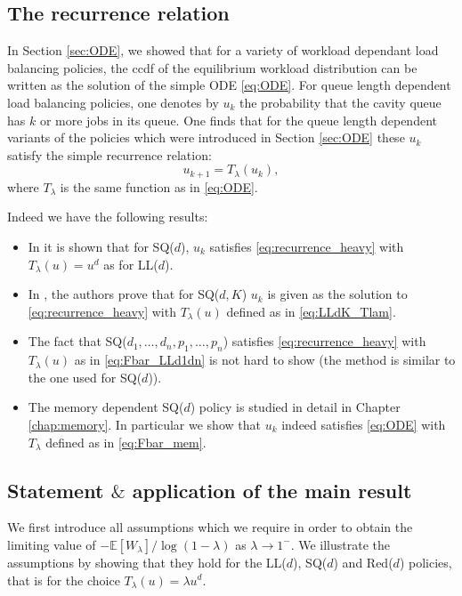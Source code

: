 \documentclass[12pt]{report}
\newcommand{\E}{\mathbb{E}}
\begin{document}
\subsection{The recurrence relation} \label{sec:recurrence}
In Section \ref{sec:ODE}, we showed that for a variety of workload dependant load balancing policies, the ccdf of the equilibrium workload distribution can be written as the solution of the simple ODE \eqref{eq:ODE}. For queue length dependent load balancing policies, one denotes by $u_k$ the probability that the cavity queue has $k$ or more jobs in its queue. One finds that for the queue length dependent variants of the policies which were introduced in Section \ref{sec:ODE} these $u_k$ satisfy the simple recurrence relation:
\begin{equation} \label{eq:recurrence_heavy}
u_{k+1} = T_\lambda(u_k),
\end{equation}
where $T_\lambda$ is the same function as in \eqref{eq:ODE}.

Indeed we have the following results:
\begin{itemize}
	\item In \cite{mitzenmacher2001power} it is shown that for SQ($d$), $u_k$ satisfies \eqref{eq:recurrence_heavy} with $T_\lambda(u)=u^d$ as for LL($d$).
	\item In \cite{van2019global}, the authors prove that for SQ($d,K$) $u_k$ is given as the solution to \eqref{eq:recurrence_heavy} with $T_\lambda(u)$ defined as in \eqref{eq:LLdK_Tlam}.
	\item The fact that SQ($d_1,\dots,d_n,p_1,\dots,p_n$) satisfies \eqref{eq:recurrence_heavy} with $T_\lambda(u)$ as in \eqref{eq:Fbar_LLd1dn} is not hard to show (the method is similar to the one used for SQ($d$)).
	\item The memory dependent SQ($d$) policy is studied in detail in Chapter \ref{chap:memory}. In particular we show that $u_k$ indeed satisfies \eqref{eq:ODE} with $T_\lambda$ defined as in \eqref{eq:Fbar_mem}.
\end{itemize}

\subsection{Statement $\&$ application of the main result}\label{sec:result}
We first introduce all assumptions which we require in order to obtain the limiting value of $-\E[W_\lambda] / \log(1-\lambda)$ as $\lambda \rightarrow 1^-$. We illustrate the assumptions by showing that they hold for the LL($d$), SQ($d$) and Red($d$) policies, that is for  the choice $T_\lambda(u) = \lambda u^d$.
\end{document}
